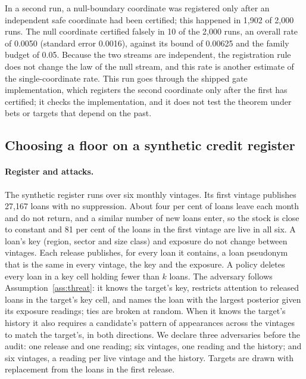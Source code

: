In a second run, a null-boundary coordinate was registered only after an independent safe coordinate had been certified; this happened in 1,902 of 2,000 runs. The null coordinate certified falsely in 10 of the 2,000 runs, an overall rate of 0.0050 (standard error 0.0016), against its bound of 0.00625 and the family budget of 0.05. Because the two streams are independent, the registration rule does not change the law of the null stream, and this rate is another estimate of the single-coordinate rate. This run goes through the shipped gate implementation, which registers the second coordinate only after the first has certified; it checks the implementation, and it does not test the theorem under bets or targets that depend on the past.

\subsection{Choosing a floor on a synthetic credit register}\label{sec:credit}
\paragraph{Register and attacks.} The synthetic register runs over six monthly vintages. Its first vintage publishes 27{,}167 loans with no suppression. About four per cent of loans leave each month and do not return, and a similar number of new loans enter, so the stock is close to constant and 81 per cent of the loans in the first vintage are live in all six. A loan's key (region, sector and size class) and exposure do not change between vintages. Each release publishes, for every loan it contains, a loan pseudonym that is the same in every vintage, the key and the exposure. A policy deletes every loan in a key cell holding fewer than $k$ loans. The adversary follows Assumption~\ref{ass:threat}: it knows the target's key, restricts attention to released loans in the target's key cell, and names the loan with the largest posterior given its exposure readings; ties are broken at random. When it knows the target's history it also requires a candidate's pattern of appearances across the vintages to match the target's, in both directions. We declare three adversaries before the audit: one release and one reading; six vintages, one reading and the history; and six vintages, a reading per live vintage and the history. Targets are drawn with replacement from the loans in the first release.

